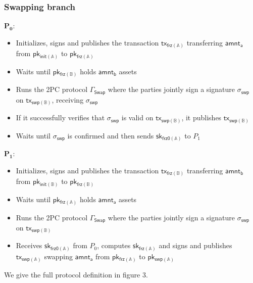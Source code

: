 \documentclass{article}      	%
\begin{document}
\subsubsection*{Swapping branch}
\: $\mathbf{P_0:}$
\begin{itemize}
    \item Initializes, signs and publishes the transaction $\mathsf{tx_{frz(\mathbb{A})}}$ transferring $\mathsf{amnt_a}$ from $\mathsf{pk_{init(\mathbb{A})}}$ to $\mathsf{pk_{frz(\mathbb{A})}}$
    \item Waits until $\mathsf{pk_{frz(\mathbb{B})}}$ holds $\mathsf{amnt_b}$ assets
    \item Runs the 2PC protocol $\Gamma_{\mathsf{Swap}}$ where the parties jointly sign a signature $\sigma_{\mathsf{swp}}$ on $\mathsf{tx_{swp(\mathbb{B})}}$, receiving $\sigma_{\mathsf{swp}}$
    \item If it successfully verifies that $\sigma_{\mathsf{swp}}$ is valid on $\mathsf{tx_{swp(\mathbb{B})}}$, it publishes $\mathsf{tx_{swp(\mathbb{B})}}$
    \item Waits until $\sigma_{\mathsf{swp}}$ is confirmed and then sends $\mathsf{sk_{frz0(\mathbb{A})}}$ to $P_1$
\end{itemize}
\: $\mathbf{P_1:}$
\begin{itemize}
    \item Initializes, signs and publishes the transaction $\mathsf{tx_{frz(\mathbb{B})}}$ transferring $\mathsf{amnt_b}$ from $\mathsf{pk_{init(\mathbb{B})}}$ to $\mathsf{pk_{frz(\mathbb{B})}}$
    \item Waits until $\mathsf{pk_{frz(\mathbb{A})}}$ holds $\mathsf{amnt_a}$ assets
    \item Runs the 2PC protocol $\Gamma_{\mathsf{Swap}}$ where the parties jointly sign a signature $\sigma_{\mathsf{swp}}$ on $\mathsf{tx_{swp(\mathbb{B})}}$
    \item Receives $\mathsf{sk_{frz0(\mathbb{A})}}$ from $P_0$, computes $\mathsf{sk_{frz(\mathbb{A})}}$ and signs and publishes $\mathsf{tx_{swp(\mathbb{A})}}$ swapping $\mathsf{amnt_a}$ from $\mathsf{pk_{frz(\mathbb{A})}}$ to $\mathsf{pk_{swp(\mathbb{A})}}$
\end{itemize}


We give the full protocol definition in figure 3.
\end{document}
